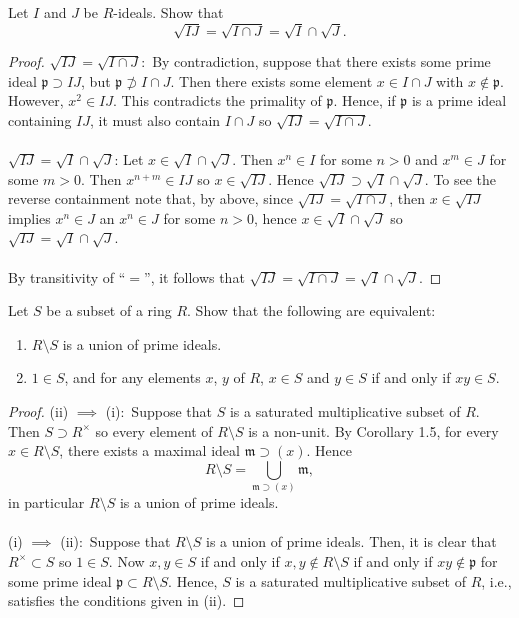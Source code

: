 \newpage
\begin{problem}
Let $I$ and $J$ be $R$-ideals. Show that
\[\sqrt{IJ}=\sqrt{I\cap J}=\sqrt{I}\cap\sqrt{J}.\]
\end{problem}
\begin{proof}
$\sqrt{IJ}=\sqrt{I\cap J}$:~By contradiction, suppose that there
exists some prime ideal $\mathfrak{p}\supset IJ$, but
$\mathfrak{p}\nsupset I\cap J$. Then there exists some element
$x\in I\cap J$ with $x\notin\mathfrak{p}$. However, $x^2\in
IJ$. This contradicts the primality of $\mathfrak{p}$. Hence, if
$\mathfrak{p}$ is a prime ideal containing $IJ$, it must also
contain $I\cap J$ so $\sqrt{IJ}=\sqrt{I\cap J}$.
\\\\
$\sqrt{IJ}=\sqrt{I}\cap\sqrt{J}$: Let
$x\in\sqrt{I}\cap\sqrt{J}$. Then $x^n\in I$ for some $n>0$ and
$x^m\in J$ for some $m>0$. Then $x^{n+m}\in IJ$ so
$x\in\sqrt{IJ}$. Hence $\sqrt{IJ}\supset\sqrt{I}\cap\sqrt{J}$. To
see the reverse containment note that, by above, since
$\sqrt{IJ}=\sqrt{I\cap J}$, then $x\in\sqrt{IJ}$ implies $x^n\in
J$ an $x^n\in J$ for some $n>0$, hence $x\in\sqrt{I}\cap\sqrt{J}$
so $\sqrt{IJ}=\sqrt{I}\cap\sqrt{J}$.
\\\\
By transitivity of ``$=$'', it follows that
$\sqrt{IJ}=\sqrt{I\cap J}=\sqrt{I}\cap\sqrt{J}$.
\end{proof}
\newpage
\begin{problem}
Let $S$ be a subset of a ring $R$. Show that the following are
equivalent:
\begin{enumerate}[noitemsep,label=(\roman*)]
\item $R\setminus S$ is a union of prime ideals.
\item $1\in S$, and for any elements $x$, $y$ of $R$, $x\in S$
  and $y\in S$ if and only if $xy\in S$.
\end{enumerate}
\end{problem}
\begin{proof}
(ii) $\implies$ (i):~Suppose that $S$ is a saturated
multiplicative subset of $R$. Then $S\supset R^\times$ so every
element of $R\setminus S$ is a non-unit. By Corollary 1.5, for
every $x\in R\setminus S$, there exists a maximal ideal
$\mathfrak{m}\supset(x)$. Hence
\[
R\setminus S=\bigcup_{\mathfrak{m}\supset(x)}\mathfrak{m},
\]
in particular $R\setminus S$ is a union of prime ideals.
\\\\
(i) $\implies$ (ii):~Suppose that $R\setminus S$ is a union of
prime ideals. Then, it is clear that $R^\times \subset S$ so
$1\in S$. Now $x,y\in S$ if and only if $x,y\notin R\setminus S$
if and only if $xy\notin\mathfrak{p}$ for some prime ideal
$\mathfrak{p}\subset R\setminus S$. Hence, $S$ is a saturated
multiplicative subset of $R$, i.e., satisfies the conditions
given in (ii).
\end{proof}
